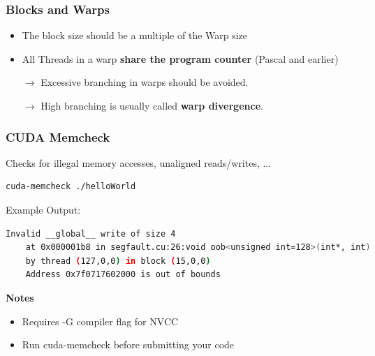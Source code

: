 \documentclass[aspectratio=169]{beamer}
\begin{document}
\begin{frame}[fragile]
	\frametitle{Blocks and Warps}
\begin{itemize}
	\item The block size should be a multiple of the Warp size
	\item All Threads in a warp \textbf{share the program counter} (Pascal and earlier)
	\item [$\rightarrow$] Excessive branching in warps should be avoided.
	\item [$\rightarrow$] High branching is usually called \textbf{warp divergence}.
\end{itemize}


\end{frame}




\begin{frame}[fragile]
\frametitle{CUDA Memcheck}
Checks for illegal memory accesses, unaligned reads/writes, ...
\begin{lstlisting}[language=bash]
cuda-memcheck ./helloWorld
\end{lstlisting}
Example Output:
\begin{lstlisting}[language=bash]
Invalid __global__ write of size 4
	at 0x000001b8 in segfault.cu:26:void oob<unsigned int=128>(int*, int)
	by thread (127,0,0) in block (15,0,0)
	Address 0x7f0717602000 is out of bounds
\end{lstlisting}
\textbf{Notes}
\begin{itemize}
\item Requires -G compiler flag for NVCC
\item Run cuda-memcheck before submitting your code
\end{itemize}

\end{frame}
\end{document}
